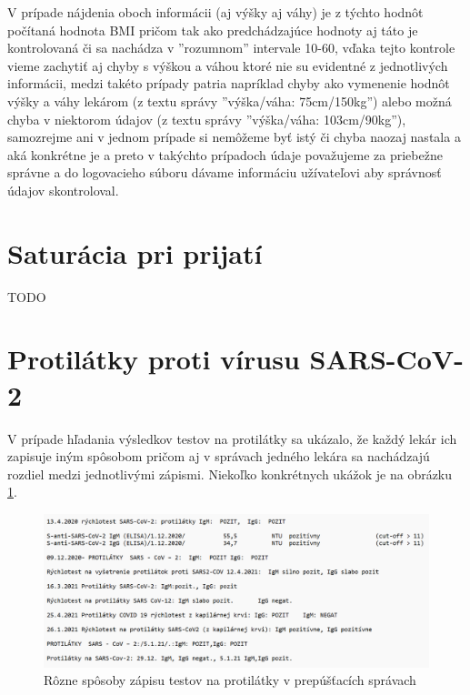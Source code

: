V prípade nájdenia oboch informácii (aj výšky aj váhy) je z týchto hodnôt počítaná hodnota BMI pričom tak ako predchádzajúce hodnoty aj táto je kontrolovaná či sa nachádza v ''rozumnom'' intervale 10-60, vďaka tejto kontrole vieme zachytiť aj chyby s výškou a váhou ktoré nie su evidentné z jednotlivých informácii, medzi takéto prípady patria napríklad chyby ako vymenenie hodnôt výšky a váhy lekárom (z textu správy ''výška/váha: 75cm/150kg'') alebo možná chyba v niektorom údajov (z textu správy ''výška/váha: 103cm/90kg''), samozrejme ani v jednom prípade si nemôžeme byť istý či chyba naozaj nastala a aká konkrétne je a preto v takýchto prípadoch údaje považujeme za priebežne správne a do logovacieho súboru dávame informáciu užívateľovi aby správnosť údajov skontroloval. 

\section{Saturácia pri prijatí}

TODO

\section{Protilátky proti vírusu SARS-CoV-2}
\label{protilatky}

V prípade hľadania výsledkov testov na protilátky sa ukázalo, že každý lekár ich zapisuje iným spôsobom pričom aj v správach jedného lekára sa nachádzajú rozdiel medzi jednotlivými zápismi. Niekoľko konkrétnych ukážok je na obrázku \ref{obr:proti}. 

\begin{figure}
	\centerline{\includegraphics[width=1\textwidth]{images/protilatky}}
	\caption[Protilátky]{Rôzne spôsoby zápisu testov na protilátky v prepúšťacích správach}
	\label{obr:proti}
\end{figure}

